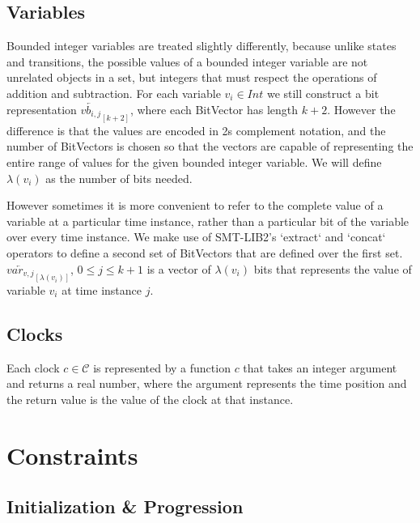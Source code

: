 \documentclass[a4paper,12pt]{article}
\newcommand*\BitAnd{\mathbin{\&}}
\newcommand*\BitOr{\mathbin{|}}
\begin{document}
\subsection{Variables}
\label{sec:orga5fa2c2}

Bounded integer variables are treated slightly differently, because unlike
states and transitions, the possible values of a bounded integer variable are
not unrelated objects in a set, but integers that must respect the operations of
addition and subtraction. For each variable \(v_i \in Int\) we still construct a
bit representation \(\overleftarrow{vb_{i,j}}_{[k+2]}\), where each BitVector
has length \(k+2\). However the difference is that the values are encoded in 2s
complement notation, and the number of BitVectors is chosen so that the vectors
are capable of representing the entire range of values for the given bounded
integer variable. We will define \(\lambda(v_i)\) as the number of bits needed.

However sometimes it is more convenient to refer to the complete value of a
variable at a particular time instance, rather than a particular bit of the
variable over every time instance. We make use of SMT-LIB2's `extract` and
`concat` operators to define a second set of BitVectors that are defined over
the first set. \(\overleftarrow{var_{v,j}}_{[\lambda(v_i)]}\), \(0 \leq j \leq
k+1\) is a vector of \(\lambda(v_i)\) bits that represents the value of variable
\(v_i\) at time instance \(j\).


\subsection{Clocks}
\label{sec:org78e9a82}

Each clock \(c \in \mathcal{C}\) is represented by a function \(c\) that takes
an integer argument and returns a real number, where the argument represents the
time position and the return value is the value of the clock at that instance.

\section{Constraints}
\label{sec:org9ef32cc}
\iffalse
TODO: mention that the operators \(\lor, \land, \BitOr , \BitAnd, \Rightarrow\) represent
bvor, bvand, etc. (in background) -  maybe explain how you are exploiting
bvlogic to write constraints - quick comment
\fi

\subsection{Initialization \& Progression}
\label{sec:org3fa6376}
\end{document}
